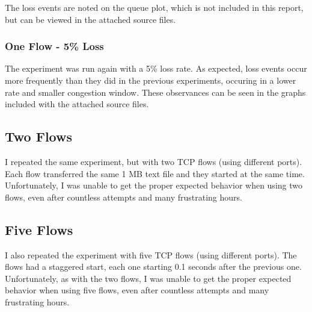 \documentclass[11pt]{article}
\begin{document}
The loss events are noted on the queue plot, which is not included in this report, but can be viewed in the attached source files.

\subsubsection{One Flow - 5\% Loss}
The experiment was run again with a 5\% loss rate. As expected, loss events occur more frequently than they did in the previous experiments, occuring in a lower rate and smaller congestion window. These observances can be seen in the graphs included with the attached source files.

\subsection{Two Flows}
I repeated the same experiment, but with two TCP flows (using different ports). Each flow transferred the same 1 MB text file and they started at the same time. Unfortunately, I was unable to get the proper expected behavior when using two flows, even after countless attempts and many frustrating hours.
\subsection{Five Flows}
I also repeated the experiment with five TCP flows (using different ports). The flows had a staggered start, each one starting 0.1 seconds after the previous one. Unfortunately, as with the two flows, I was unable to get the proper expected behavior when using five flows, even after countless attempts and many frustrating hours.

\vspace{0.5cm}
\end{document}
